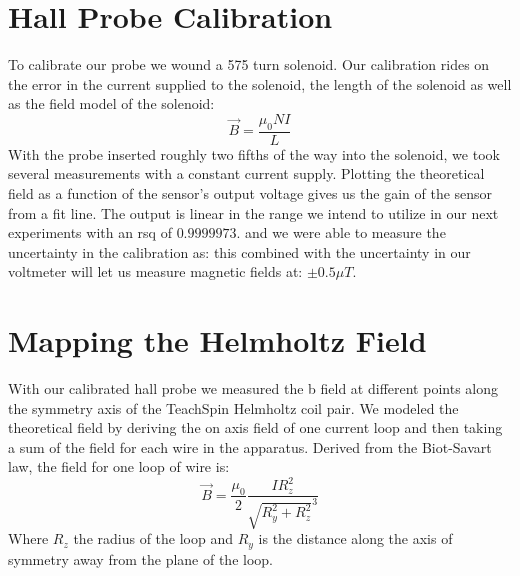 \documentclass[aps,twocolumn,secnumarabic,balancelastpage,amsmath,amssymb,nofootinbib,floatfix]{revtex4-1}
\begin{document}

\section{Hall Probe Calibration}

To calibrate our probe we wound a 575 turn solenoid. Our calibration rides on the error in the current supplied to the solenoid, the length of the solenoid as well as the field model of the solenoid: 
$$\vec B = \frac{\mu_0 N I}{L}$$ 
With the probe inserted roughly two fifths of the way into the solenoid, we took several measurements with a constant current supply. Plotting the theoretical field as a function of the sensor's output voltage gives us the gain of the sensor from a fit line. The output is linear in the range we intend to utilize in our next experiments with an rsq of $0.9999973$.  and we were able to measure the uncertainty in the calibration as: this combined with the uncertainty in our voltmeter will let us measure magnetic fields at: $\pm 0.5 \mu T$.




\section{Mapping the Helmholtz Field}
With our calibrated hall probe we measured the b field at different points along the symmetry  axis of the TeachSpin Helmholtz coil pair. We modeled the theoretical field by deriving the on axis field of one current loop and then taking a sum of the field for each wire in the apparatus.  Derived from the Biot-Savart law, the field for one loop of wire is:
$$\vec{B}=\frac{\mu_0}{2}\frac{I R_z^2}{\sqrt{R_y^2 + R_z^2}^3}$$
Where $R_z$ the radius of the loop and $R_y$ is the distance along the axis of symmetry away from the plane of the loop. \cite{knight}
\end{document}
